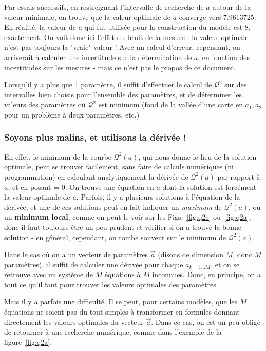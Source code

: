 \documentclass[main.tex]{subfiles}
\begin{document}
Par essais successifs, en restreignant l'intervalle de recherche de $a$ autour de la valeur minimale, on trouve que la valeur optimale de $a$ converge vers 7.9613725. En réalité, la valeur de $a$ qui fut utilisée pour la construction du modèle est 8, exactement. On voit donc ici l'effet du bruit de la mesure : la valeur optimale n'est pas toujours la "vraie" valeur ! Avec un calcul d'erreur, cependant, on arriverait à calculer une incertitude sur la détermination de $a$, en fonction des incertitudes sur les mesures - mais ce n'est pas le propos de ce document.

Lorsqu'il y a plus que 1 paramètre, il suffit d'effectuer le calcul de $\mathcal{Q}^2$ sur des intervalles bien choisis pour l'ensemble des paramètres, et de déterminer les valeurs des paramètres où $\mathcal{Q}^2$ est minimum (fond de la vallée d'une carte en $a_1,a_2$ pour un problème à deux paramètres, etc.)

\subsubsection{Soyons plus malins, et utilisons la dérivée !}

En effet, le minimum de la courbe $\mathcal{Q}^2(a)$, qui nous donne le lieu de la solution optimale, peut se trouver facilement, sans faire de calculs numériques (ni programmation) en calculant analytiquement la dérivée de $\mathcal{Q}^2(a)$ par rapport à $a$, et en posant = 0. On trouve une équation en $a$ dont la solution est forcément la valeur optimale de $a$. Parfois, il y a plusieurs solutions à l'équation de la dérivée, et une de ces solutions peut en fait indiquer un \textit{maximum} de $\mathcal{Q}^2(a)$, ou un \textbf{minimum local}, comme on peut le voir sur les Figs.~\ref{fig:q2c} ou~\ref{fig:q2a}, donc il faut toujours être un peu prudent et vérifier si on a trouvé la bonne solution - en général, cependant, on tombe souvent sur le minimum de $\mathcal{Q}^2(a)$.

Dans le cas où on a un vecteur de paramètres $\vec{a}$ (disons de dimension $M$, donc $M$ paramètres), il suffit de calculer une dérivée pour chaque $a_{k=1\dots M}$, et on se retrouve avec un système de $M$ équations à $M$ inconnues. Donc, en principe, on a tout ce qu'il faut pour trouver les valeurs optimales des paramètres.

Mais il y a parfois une difficulté. Il se peut, pour certains modèles, que les $M$ équations ne soient pas du tout simples à transformer en formules donnant directement les valeurs optimales du vecteur $\vec{a}$. Dans ce cas, on est un peu obligé de retourner à une recherche numérique, comme dans l'exemple de la figure~\ref{fig:q2a}.
\end{document}
